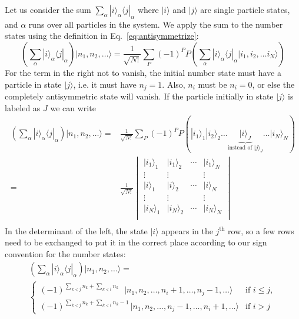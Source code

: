 \documentclass[oneside,11pt]{memoir}
\begin{document}
Let us consider the sum $\sum_{\alpha} |i\rangle_{\alpha} \langle j | _{\alpha}
$ where $|i\rangle$ and $|j\rangle$ are single particle states, and $\alpha$
runs over all particles in the system.  We apply the sum to the number states
using the definition in Eq.~\ref{eq:antisymmetrize}: 
\begin{equation}
  \left(
   \sum_{\alpha} |i\rangle_{\alpha} \langle j | _{\alpha}  \right)
  | n_{1},  n_{2}, \ldots \rangle = 
  \frac{1}{\sqrt{N!}} \sum_{P} (- 1)^{P} P 
  \left( \sum_{\alpha} |i\rangle_{\alpha} \langle j | _{\alpha} 
   | i_{1},  i_{2}, \ldots i_{N} \rangle \right)
\end{equation}
For the term in the right not to vanish, the initial number state  must have a
particle in state $|j\rangle$, i.e. it must have $n_{j}=1$. Also, $n_{i}$ must
be $n_{i}=0$,  or else the completely antisymmetric state will vanish.  If the
particle initially in state $|j\rangle$ is labeled as  $J$  we can write
\begin{equation}
\begin{split}
  \left(
   \sum_{\alpha} |i\rangle_{\alpha} \langle j | _{\alpha}  \right)
  | n_{1},  n_{2}, \ldots \rangle = &
  \frac{1}{\sqrt{N!}} \sum_{P} (- 1)^{P} P \left( 
    |i_{1}\rangle_{1}
    |i_{2}\rangle_{2}
    \ldots 
     \!\!\!\!\!\!
    \underbrace{ 
    |i\rangle_{J} }_{\text{instead of } |j\rangle_{J}} 
     \!\!\!\!\!\!
    \ldots 
    |i_{N}\rangle_{N}
  \right) \\
   =&  
  \frac{1}{\sqrt{N!}}
  \begin{vmatrix}
  |i_{1}\rangle_{1} & |i_{1}\rangle_{2} & \dotsm & |i_{1}\rangle_{N} \\
  \vdots &  \vdots &     & \vdots \\
  |i\rangle_{1} & |i\rangle_{2} & \dotsm & |i\rangle_{N} \\
  \vdots &  \vdots &     & \vdots \\
  |i_{N}\rangle_{1} & |i_{N}\rangle_{2} & \dotsm & |i_{N}\rangle_{N} \\
\end{vmatrix} \\
\end{split} 
\end{equation}
In the determinant of the left, the state $|i\rangle$ appears in the
$j^{\text{th}}$ row, so a few rows need to be exchanged to put it in the
correct place according to our sign convention for the number states:
\begin{multline}
  \left(
   \sum_{\alpha} |i\rangle_{\alpha} \langle j | _{\alpha}  \right)
  | n_{1},  n_{2}, \ldots \rangle = \\  
 \begin{cases}
(-1)^{\sum_{k<j} n_{k} + \sum_{k<i}n_{k}~~~}
   \,| n_{1}, n_{2},  \ldots, n_{i}+1, \ldots,  n_{j}-1, \ldots  \rangle   
& \text{if $i\leq j$},\\
(-1)^{\sum_{k<j} n_{k} + \sum_{k<i}n_{k} -1 } 
   \,| n_{1}, n_{2},  \ldots, n_{j}-1, \ldots,  n_{i}+1, \ldots  \rangle
& \text{if $i>j$}
\end{cases}  
\end{multline}
\end{document}
